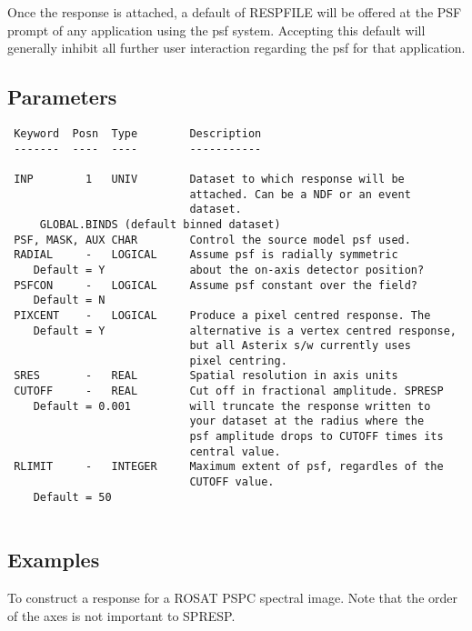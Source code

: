 \documentclass{book}
\renewcommand{\_}{{\tt\char'137}}     %
\begin{document}
Once the response is attached, a default of RESPFILE will be
offered at the PSF prompt of any application using the psf system.
Accepting this default will generally inhibit all further user
interaction regarding the psf for that application.
 
\subsection{Parameters}
\begin{verbatim}
 Keyword  Posn  Type        Description
 -------  ----  ----        -----------
 
 INP        1   UNIV        Dataset to which response will be
                            attached. Can be a NDF or an event
                            dataset.
     GLOBAL.BINDS (default binned dataset)
 PSF, MASK, AUX CHAR        Control the source model psf used.
 RADIAL     -   LOGICAL     Assume psf is radially symmetric
    Default = Y             about the on-axis detector position?
 PSFCON     -   LOGICAL     Assume psf constant over the field?
    Default = N
 PIXCENT    -   LOGICAL     Produce a pixel centred response. The
    Default = Y             alternative is a vertex centred response,
                            but all Asterix s/w currently uses
                            pixel centring.
 SRES       -   REAL        Spatial resolution in axis units
 CUTOFF     -   REAL        Cut off in fractional amplitude. SPRESP
    Default = 0.001         will truncate the response written to
                            your dataset at the radius where the
                            psf amplitude drops to CUTOFF times its
                            central value.
 RLIMIT     -   INTEGER     Maximum extent of psf, regardles of the
                            CUTOFF value.
    Default = 50
 
\end{verbatim}\subsection{Examples}
To construct a response for a ROSAT PSPC spectral image. Note that
the order of the axes is not important to SPRESP.
\end{document}
